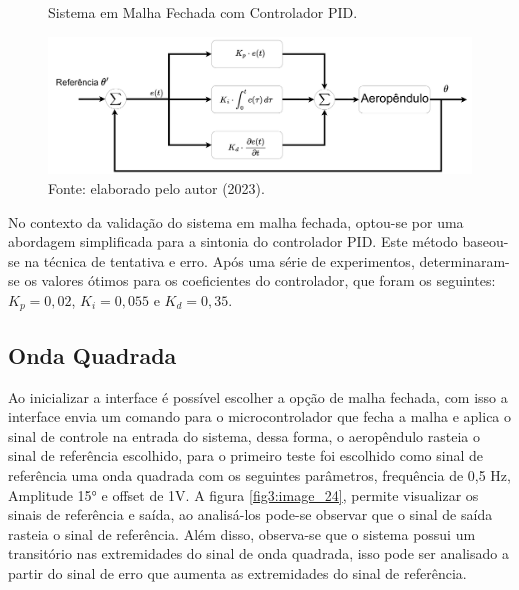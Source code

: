 \begin{figure}[!h]
	\centering
	\caption{Sistema em Malha Fechada com Controlador PID.}
	\includegraphics[width=1\textwidth]{Capitulos/3_1_resultados_discurcao/3_figuras/estrutura_pid.pdf}
	\caption*{Fonte: elaborado pelo autor (2023).}
	\label{fig3:image_23}
\end{figure}


No contexto da validação do sistema em malha fechada, optou-se por uma abordagem simplificada para a sintonia do controlador PID. Este método baseou-se na técnica de tentativa e erro. Após uma série de experimentos, determinaram-se os valores ótimos para os coeficientes do controlador, que foram os seguintes: $K_p=0,02$, $K_i=0,055$ e $K_d=0,35$.



\subsection{Onda Quadrada}

Ao inicializar a interface é possível escolher a opção de malha fechada, com isso a interface envia um comando para o microcontrolador que fecha a malha e aplica o sinal de controle na entrada do sistema, dessa forma, o aeropêndulo rasteia o sinal de referência escolhido, para o primeiro teste foi escolhido como sinal de referência uma onda quadrada com os seguintes parâmetros, frequência de 0,5 Hz, Amplitude 15° e offset de 1V. A figura \ref{fig3:image_24}, permite visualizar os sinais de referência e saída, ao analisá-los pode-se observar que o sinal de saída rasteia o sinal de referência. Além disso, observa-se que o sistema possui um transitório nas extremidades do sinal de onda quadrada, isso pode ser analisado a partir do sinal de erro que aumenta as extremidades do sinal de referência.

